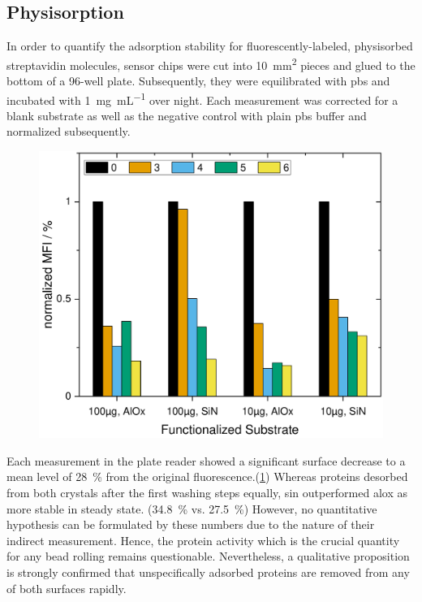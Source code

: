 \subsection{Physisorption}
In order to quantify the adsorption stability for fluorescently-labeled, physisorbed streptavidin molecules, sensor chips were cut into \SI{10}{\milli\meter\squared} pieces and glued to the bottom of a 96-well plate. Subsequently, they were equilibrated with \gls{pbs} and incubated with \SI{1}{\milli\gram\per\milli\liter} over night. Each measurement was corrected for a blank substrate as well as the negative control with plain \gls{pbs} buffer and normalized subsequently.\\ 
\begin{figure}[h!]
	\centering
	\includegraphics[width=.7\linewidth]{Ressources/ResultPlots/SurfaceFuncSiNAlOx}
	\label{fig:unsp:wash}
\end{figure}
Each measurement in the plate reader showed a significant surface decrease to a mean level of \SI{28}{\percent} from the original fluorescence.(\cref{fig:unsp:wash}) Whereas proteins desorbed from both crystals after the first washing steps equally, \gls{sin} outperformed \gls{alox} as more stable in steady state. (\SI{34.8}{\percent} vs. \SI{27.5}{\percent}) However, no quantitative hypothesis can be formulated by these numbers due to the nature of their indirect measurement. Hence, the protein activity which is the crucial quantity for any bead rolling remains questionable. Nevertheless, a qualitative proposition is strongly confirmed that unspecifically adsorbed proteins are removed from any of both surfaces rapidly.


